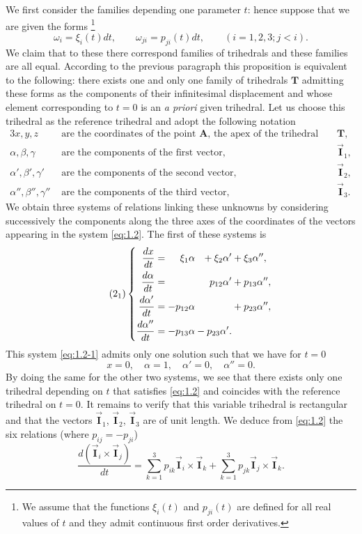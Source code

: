 \documentclass[leqno,11pt]{book}
\numberwithin{equation}{chapter}
\theoremstyle{shape1}
\theoremstyle{shapesmall}
\newcommand{\rvec}[1]{\vec{\mathbf{#1}}}
\newcommand{\ivec}{\rvec{I}}
\begin{document}
We first consider the families depending one parameter $t$: hence suppose that we are given the forms \footnote{We assume that the functions $\xi_{i}(t)$ and $p_{ji}(t)$ are defined for all real values of $t$ and they admit continuous first order derivatives.}
\[
\omega_{i}=\xi_{i}(t)dt,\qquad
\omega_{ji}=p_{ji}(t)dt,\qquad
(i=1,2,3;j<i).
\]
We claim that to these there correspond families of trihedrals and these families are all equal. According to the previous paragraph this proposition is equivalent to the following: there exists one and only one family of trihedrals $\mathbf{T}$ admitting these forms as the components of their infinitesimal displacement and whose element corresponding to $t=0$ is an \emph{a priori} given trihedral. Let us choose this trihedral as the reference trihedral and adopt the following notation
\begin{alignat*}{3}
  x,y,z&\text{ are the coordinates of the point $\mathbf{A}$, the apex of the trihedral }&&\mathbf{T},\\
  \alpha,\beta,\gamma&\text{ are the components of the first vector, }&&\ivec_{1},\\
  \alpha',\beta',\gamma'&\text{ are the components of the second vector, }&&\ivec_{2},\\
  \alpha'',\beta'',\gamma''&\text{ are the components of the third vector, }&&\ivec_{3}.
\end{alignat*}
We obtain three systems of relations linking these unknowns by considering successively the components along the three axes of the coordinates of the vectors appearing in the system \eqref{eq:1.2}. The first of these systems is
\begin{equation}
  \label{eq:1.2-1}\tag{2$_{1}$}
  \left\{
    \begin{alignedat}{4}
      \frac{dx}{dt}&={}&\xi_{1}\alpha&&{}+\xi_{2}\alpha'&+\xi_{3}\alpha'',\\
      \frac{d\alpha}{dt}&={}&&&p_{12}\alpha'&+p_{13}\alpha'',\\
      \frac{d\alpha'}{dt}&={}&-p_{12}\alpha&&&+p_{23}\alpha'',\\
      \frac{d\alpha''}{dt}&={}&-p_{13}\alpha&&{}-p_{23}\alpha'.&
    \end{alignedat}
  \right.
\end{equation}
This system \eqref{eq:1.2-1} admits only one solution such that we have for $t=0$
\[
x=0,\quad\alpha=1,\quad\alpha'=0,\quad\alpha''=0.
\]
By doing the same for the other two systems, we see that there exists only one trihedral depending on $t$ that satisfies \eqref{eq:1.2} and coincides with the reference trihedral on $t=0$. It remains to verify that this variable trihedral is rectangular and that the vectors $\ivec_{1}$, $\ivec_{2}$, $\ivec_{3}$ are of unit length. We deduce from \eqref{eq:1.2} the six relations (where $p_{ij}=-p_{ji}$)
\[
\frac{d(\ivec_{i}\times\ivec_{j})}{dt}=\sum_{k=1}^{3} p_{ik}\ivec_{i}\times\ivec_{k}+\sum_{k=1}^{3}p_{jk}\ivec_{j}\times\ivec_{k}.
\]
\end{document}
